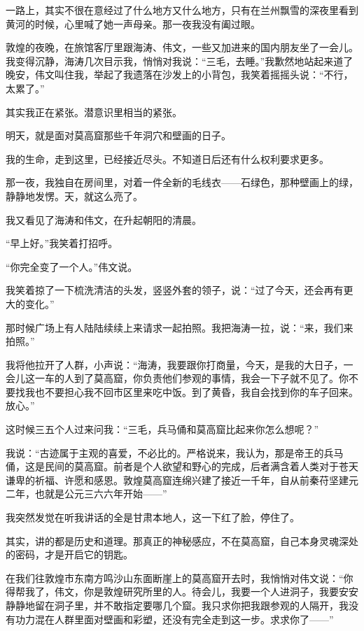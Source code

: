 \par 一路上，其实不很在意经过了什么地方又什么地方，只有在兰州飘雪的深夜里看到黄河的时候，心里喊了她一声母亲。那一夜我没有阖过眼。
\par 敦煌的夜晚，在旅馆客厅里跟海涛、伟文，一些又加进来的国内朋友坐了一会儿。我变得沉静，海涛几次目示我，悄悄对我说：“三毛，去睡。”我歉然地站起来道了晚安，伟文叫住我，举起了我遗落在沙发上的小背包，我笑着摇摇头说：“不行，太累了。”
\par 其实我正在紧张。潜意识里相当的紧张。
\par 明天，就是面对莫高窟那些千年洞穴和壁画的日子。
\par 我的生命，走到这里，已经接近尽头。不知道日后还有什么权利要求更多。
\par 那一夜，我独自在房间里，对着一件全新的毛线衣——石绿色，那种壁画上的绿，静静地发愣。天，就这么亮了。
\par 
\par 我又看见了海涛和伟文，在升起朝阳的清晨。
\par “早上好。”我笑着打招呼。
\par “你完全变了一个人。”伟文说。
\par 我笑着掠了一下梳洗清洁的头发，竖竖外套的领子，说：“过了今天，还会再有更大的变化。”
\par 那时候广场上有人陆陆续续上来请求一起拍照。我把海涛一拉，说：“来，我们来拍照。”
\par 我将他拉开了人群，小声说：“海涛，我要跟你打商量，今天，是我的大日子，一会儿这一车的人到了莫高窟，你负责他们参观的事情，我会一下子就不见了。你不要找我也不要担心我不回市区里来吃中饭。到了黄昏，我自会找到你的车子回来。放心。”
\par 这时候三五个人过来问我：“三毛，兵马俑和莫高窟比起来你怎么想呢？”
\par 我说：“古迹属于主观的喜爱，不必比的。严格说来，我认为，那是帝王的兵马俑，这是民间的莫高窟。前者是个人欲望和野心的完成，后者满含着人类对于苍天谦卑的祈福、许愿和感恩。敦煌莫高窟连绵兴建了接近一千年，自从前秦苻坚建元二年，也就是公元三六六年开始——”
\par 我突然发觉在听我讲话的全是甘肃本地人，这一下红了脸，停住了。
\par 其实，讲的都是历史和道理。那真正的神秘感应，不在莫高窟，自己本身灵魂深处的密码，才是开启它的钥匙。
\par 在我们往敦煌市东南方鸣沙山东面断崖上的莫高窟开去时，我悄悄对伟文说：“你得帮我了，伟文，你是敦煌研究所里的人。待会儿，我要一个人进洞子，我要安安静静地留在洞子里，并不敢指定要哪几个窟。我只求你把我跟参观的人隔开，我没有功力混在人群里面对壁画和彩塑，还没有完全走到这一步。求求你了——”
